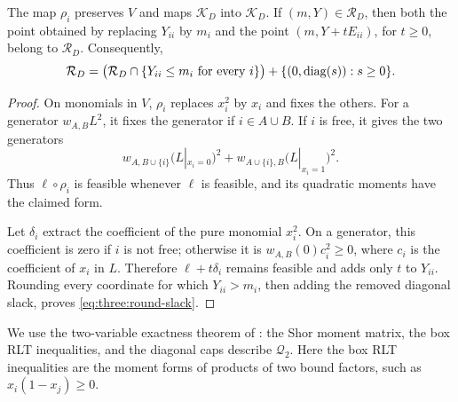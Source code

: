 \begin{lemma}\label{three:rounding}
The map $\rho_i$ preserves $V$ and maps $\mathcal K_D$ into $\mathcal K_D$. If
$(m,Y)\in \mathcal R_D$, then both the point obtained by replacing $Y_{ii}$ by
$m_i$ and the point $(m,Y+tE_{ii})$, for $t\ge0$, belong to $\mathcal R_D$.
Consequently,
\begin{equation}\label{eq:three:round-slack}
 \mathcal R_D=\bigl(\mathcal R_D\cap\{Y_{ii}\le m_i\text{ for every }i\}\bigr)
       +\{(0,\operatorname{diag}(s)):s\ge0\}.
\end{equation}
\end{lemma}
\begin{proof}
On monomials in $V$, $\rho_i$ replaces $x_i^2$ by $x_i$ and fixes the
others. For a generator $w_{A,B}L^2$, it fixes the generator if
$i\in A\cup B$. If $i$ is free, it gives the two generators
\[
 w_{A,B\cup\{i\}}\bigl(L|_{x_i=0}\bigr)^2
 +w_{A\cup\{i\},B}\bigl(L|_{x_i=1}\bigr)^2.
\]
Thus $\ell\circ\rho_i$ is feasible whenever $\ell$ is feasible, and its
quadratic moments have the claimed form.

Let $\delta_i$ extract the coefficient of the pure monomial $x_i^2$.
On a generator, this coefficient is zero if $i$ is not free; otherwise it
is $w_{A,B}(0)c_i^2\ge0$, where $c_i$ is the coefficient of $x_i$ in $L$.
Therefore $\ell+t\delta_i$ remains feasible and adds only $t$ to $Y_{ii}$.
Rounding every coordinate for which $Y_{ii}>m_i$, then adding the removed
diagonal slack, proves \eqref{eq:three:round-slack}.
\end{proof}

We use the two-variable exactness theorem of
\citet[Theorem~6]{AnstreicherBurer2010}:
the Shor moment matrix, the box RLT inequalities, and the diagonal caps
describe $\mathcal Q_2$. Here the box RLT inequalities are the moment
forms of products of two bound factors, such as $x_i(1-x_j)\ge0$.

